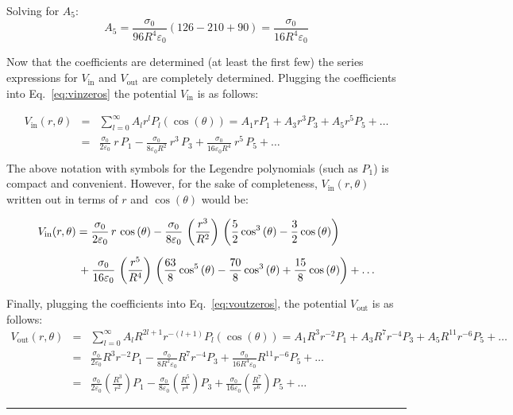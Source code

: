 \documentclass[12pt]{article}
\begin{document}
\begin{flushleft}
Solving for $A_{5}$:
\begin{equation*}
 A_{5} = \frac{\sigma_{0}}{96R^{4}\varepsilon_{0}}\left( 126 - 210 + 90 \right) = \frac{\sigma_{0}}{16R^{4}\varepsilon_{0}}
\end{equation*}

Now that the coefficients are determined (at least the first few) the series expressions for $V_{\text{in}}$ and $V_{\text{out}}$ are completely determined.  Plugging the coefficients into Eq.~\ref{eq:vinzeros} the potential $V_{\text{in}}$ is as follows:
 
\begin{eqnarray*}
V_{\text{in}}(r,\theta) & = & \sum_{l=0}^{\infty} A_{l}r^{l} P_{l}(\cos{(\theta)}) = A_{1}rP_{1}+A_{3}r^{3}P_{3}+A_{5}r^{5}P_{5}+\ldots \\[6pt]
& = & \frac{\sigma_{0}}{2\varepsilon_{0}} \: r \,P_{1} - \frac{\sigma_{0}}{8\varepsilon_{0} R^{2}} \: r^{3} \, P_{3} + \frac{\sigma_{0}}{16\varepsilon_{0} R^{4}} \: r^{5} \, P_{5}+\ldots  \\[6pt]
\end{eqnarray*}
The above notation with symbols for the Legendre polynomials (such as $P_{1}$) is compact and convenient.  However, for the sake of completeness, $V_{\text{in}}(r,\theta)$ written out in terms of $r$ and $\cos{(\theta)}$ would be:

\begin{align}
&  V_{\text{in}}(r,\theta) = \frac{\sigma_{0}}{2\varepsilon_{0}} \, r \, \cos{(\theta)} - \frac{\sigma_{0}}{8\varepsilon_{0}} \, \left(\frac{r^{3}}{R^{2}}\right) \, \left( \frac{5}{2}\cos^{3}{(\theta)} - \frac{3}{2}\cos{(\theta)} \right) \notag \\[6pt]
& \hspace{.5in} + \frac{\sigma_{0}}{16\varepsilon_{0}} \, \left(\frac{r^{5}}{R^{4}}\right) \, \left( \frac{63}{8}\cos^{5}{(\theta)}-\frac{70}{8}\cos^{3}{(\theta)}+\frac{15}{8}\cos{(\theta)} \right) + \ldots \notag
\end{align}

\vspace{.2in}
Finally, plugging the coefficients into Eq.~\ref{eq:voutzeros}, the potential $V_{\text{out}}$ is as follows:
\begin{eqnarray*}
V_{\text{out}}(r,\theta) &  = & \sum_{l=0}^{\infty} A_{l}R^{2l+1}r^{-(l+1)} P_{l}(\cos{(\theta)}) = A_{1}R^{3}r^{-2}P_{1} + A_{3}R^{7}r^{-4}P_{3} + A_{5}R^{11}r^{-6}P_{5} + \ldots \\[6pt]
& = &  \frac{\sigma_{0}}{2\varepsilon_{0}} R^{3}r^{-2}P_{1} -\frac{\sigma_{0}}{8R^{2}\varepsilon_{0}}R^{7}r^{-4}P_{3} + \frac{\sigma_{0}}{16R^{4}\varepsilon_{0}}R^{11}r^{-6}P_{5} + \ldots \\[6pt]
& = &  \frac{\sigma_{0}}{2\varepsilon_{0}} \left( \frac{R^{3}}{r^{2}} \right) P_{1} - \frac{\sigma_{0}}{8\varepsilon_{0}}\left( \frac{R^{5}}{r^{4}} \right) P_{3} + \frac{\sigma_{0}}{16\varepsilon_{0}}\left( \frac{R^{7}}{r^{6}} \right) P_{5} + \ldots 
\end{eqnarray*}


 {\color{grey} \rule{\linewidth}{0.7mm} }\\
 
 \end{flushleft}
\end{document}
